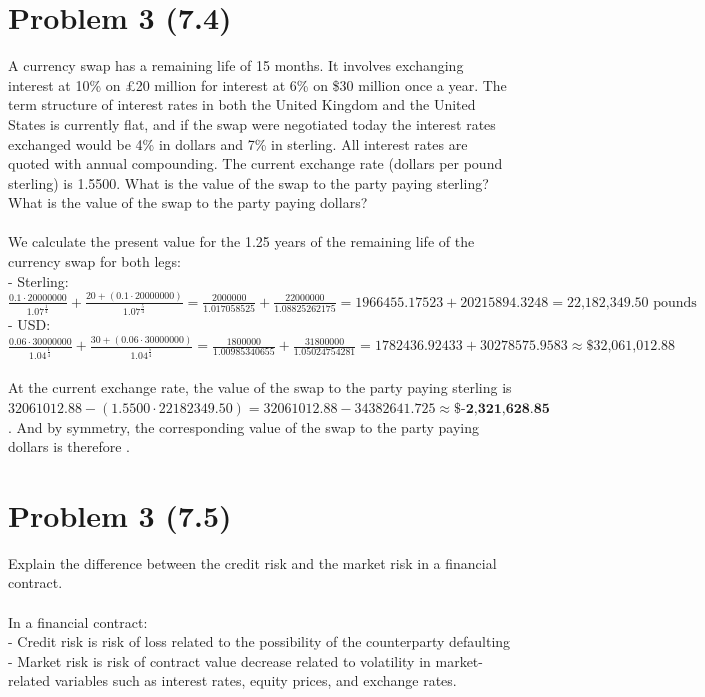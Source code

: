 \documentclass{article}
\begin{document}
{\Large 

\section*{Problem 3 (7.4)}
A currency swap has a remaining life of 15 months. It involves exchanging interest at 10\% on £20 million for interest at 6\% on \$30 million once a year. The term structure of interest rates in both the United Kingdom and the United States is currently flat, and if the swap were negotiated today the interest rates exchanged would be 4\% in dollars and 7\% in sterling. All interest rates are quoted with annual compounding. The current exchange rate (dollars per pound sterling) is 1.5500. What is the value of the swap to the party paying sterling? What is the value of the swap to the party paying dollars? \\ \\
We calculate the present value for the 1.25 years of the remaining life of the currency swap for both legs: \\
- Sterling: \(\frac{0.1 \cdot 20000000}{1.07^\frac{1}{4}} + \frac{20 + (0.1 \cdot 20000000)}{1.07^\frac{5}{4}} = \frac{2000000}{1.017058525} + \frac{22000000}{1.08825262175} = 1966455.17523 + 20215894.3248 = \text{22,182,349.50 pounds}\) \\
- USD: \(\frac{0.06 \cdot 30000000}{1.04^\frac{1}{4}} + \frac{30 + (0.06 \cdot 30000000)}{1.04^\frac{5}{4}} = \frac{1800000}{1.00985340655} + \frac{31800000}{1.05024754281} = 1782436.92433 + 30278575.9583 \approx \text{\$32,061,012.88}\) \\ \\
At the current exchange rate, the value of the swap to the party paying sterling is \(32061012.88 - (1.5500 \cdot 22182349.50) = 32061012.88 - 34382641.725 \approx \boxed{\textbf{\$-2,321,628.85}}\). And by symmetry, the corresponding value of the swap to the party paying dollars is therefore .

}
{\Large 

\section*{Problem 3 (7.5)}
Explain the difference between the credit risk and the market risk in a financial contract. \\ \\
In a financial contract: \\
- Credit risk is risk of loss related to the possibility of the counterparty defaulting \\
- Market risk is risk of contract value decrease related to volatility in market-related variables such as interest rates, equity prices, and exchange rates.

}
\end{document}

